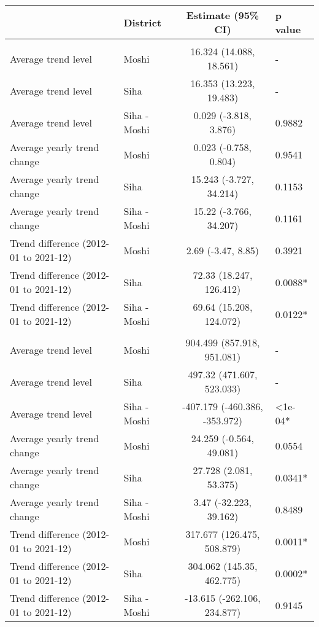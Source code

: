 \begingroup
\fontsize{12.0pt}{14.4pt}\selectfont
\begin{longtable}{l|lcl}
\toprule
 & District & Estimate (95\% CI) & p value \\ 
\midrule\addlinespace[2.5pt]
\multicolumn{4}{l}{Cancer} \\[2.5pt] 
\midrule\addlinespace[2.5pt]
Average trend level & Moshi & 16.324 (14.088, 18.561) & - \\ 
Average trend level & Siha & 16.353 (13.223, 19.483) & - \\ 
Average trend level & Siha - Moshi & 0.029 (-3.818, 3.876) & 0.9882 \\ 
Average yearly trend change & Moshi & 0.023 (-0.758, 0.804) & 0.9541 \\ 
Average yearly trend change & Siha & 15.243 (-3.727, 34.214) & 0.1153 \\ 
Average yearly trend change & Siha - Moshi & 15.22 (-3.766, 34.207) & 0.1161 \\ 
Trend difference (2012-01 to 2021-12) & Moshi & 2.69 (-3.47, 8.85) & 0.3921 \\ 
Trend difference (2012-01 to 2021-12) & Siha & 72.33 (18.247, 126.412) & 0.0088* \\ 
Trend difference (2012-01 to 2021-12) & Siha - Moshi & 69.64 (15.208, 124.072) & 0.0122* \\ 
\midrule\addlinespace[2.5pt]
\multicolumn{4}{l}{Cardiovascular Diseases} \\[2.5pt] 
\midrule\addlinespace[2.5pt]
Average trend level & Moshi & 904.499 (857.918, 951.081) & - \\ 
Average trend level & Siha & 497.32 (471.607, 523.033) & - \\ 
Average trend level & Siha - Moshi & -407.179 (-460.386, -353.972) & <1e-04* \\ 
Average yearly trend change & Moshi & 24.259 (-0.564, 49.081) & 0.0554 \\ 
Average yearly trend change & Siha & 27.728 (2.081, 53.375) & 0.0341* \\ 
Average yearly trend change & Siha - Moshi & 3.47 (-32.223, 39.162) & 0.8489 \\ 
Trend difference (2012-01 to 2021-12) & Moshi & 317.677 (126.475, 508.879) & 0.0011* \\ 
Trend difference (2012-01 to 2021-12) & Siha & 304.062 (145.35, 462.775) & 0.0002* \\ 
Trend difference (2012-01 to 2021-12) & Siha - Moshi & -13.615 (-262.106, 234.877) & 0.9145 \\ 

\end{longtable}
